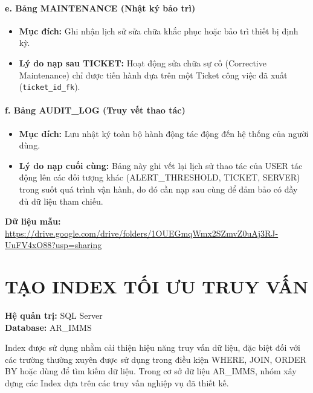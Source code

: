\paragraph{e. Bảng MAINTENANCE (Nhật ký bảo trì)}
\begin{itemize}
    \item \textbf{Mục đích:} Ghi nhận lịch sử sửa chữa khắc phục hoặc bảo trì thiết bị định kỳ.
    \item \textbf{Lý do nạp sau TICKET:} Hoạt động sửa chữa sự cố (Corrective Maintenance) chỉ được tiến hành dựa trên một Ticket công việc đã xuất (\texttt{ticket\_id\_fk}).
\end{itemize}

\paragraph{f. Bảng AUDIT\_LOG (Truy vết thao tác)}
\begin{itemize}
    \item \textbf{Mục đích:} Lưu nhật ký toàn bộ hành động tác động đến hệ thống của người dùng.
    \item \textbf{Lý do nạp cuối cùng:} Bảng này ghi vết lại lịch sử thao tác của USER tác động lên các đối tượng khác (ALERT\_THRESHOLD, TICKET, SERVER) trong suốt quá trình vận hành, do đó cần nạp sau cùng để đảm bảo có đầy đủ dữ liệu tham chiếu.
\end{itemize}

\noindent \textbf{Dữ liệu mẫu:} \url{https://drive.google.com/drive/folders/1OUEGmqWmx2SZmvZ0uAj3RJ-UuFV4xO88?usp=sharing}

\section{TẠO INDEX TỐI ƯU TRUY VẤN}
\noindent \textbf{Hệ quản trị:} SQL Server \\
\textbf{Database:} AR\_IMMS

\vspace{0.5em}
Index được sử dụng nhằm cải thiện hiệu năng truy vấn dữ liệu, đặc biệt đối với các trường thường xuyên được sử dụng trong điều kiện WHERE, JOIN, ORDER BY hoặc dùng để tìm kiếm dữ liệu. Trong cơ sở dữ liệu AR\_IMMS, nhóm xây dựng các Index dựa trên các truy vấn nghiệp vụ đã thiết kế.

